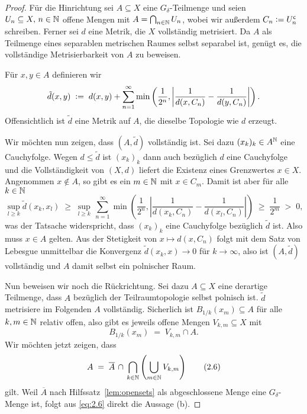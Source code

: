 \documentclass[../main/main.tex]{subfiles}
\begin{document}
	\begin{proof}
		Für die Hinrichtung sei $A \subseteq X$ eine $G_\delta$-Teilmenge und seien 
		$U_n \subseteq X, \, n \in \mathbb{N}$ offene Mengen mit 
		$A = \bigcap_{n \in \mathbb{N}} U_n$, wobei wir außerdem 
		$C_n \vcentcolon = U_n^{\mathsf{c}}$ schreiben. Ferner sei 
		$d$ eine Metrik, die $X$ vollständig metrisiert. 
		Da $A$ als Teilmenge eines separablen metrischen Raumes 
		selbst separabel ist, genügt es, die vollständige Metrisierbarkeit 
		von $A$ zu beweisen.
		
		Für $x, y \in A$ definieren wir
		\[\tilde{d}(x, y) \; \vcentcolon = \; d(x, y) + \sum_{n=1}^{\infty} \min \left(
		\frac{1}{2^n}, \left| \frac{1}{d(x, C_n)} - \frac{1}{d(y, C_n)} \right|
		\right) \text{.}\]
		Offensichtlich ist $\tilde{d}$ eine Metrik auf $A$, 
		die dieselbe Topologie wie $d$ erzeugt. 
		
		Wir möchten nun zeigen, dass $(A, \tilde{d})$ vollständig ist. 
		Sei dazu $(x_k)_k \in A^{\mathbb{N}}$ eine Cauchyfolge. Wegen $d \leq \tilde{d}$ 
		ist $(x_k)_k$ dann auch bezüglich $d$ eine Cauchyfolge und die 
		Vollständigkeit von $(X, d)$ liefert die Existenz eines Grenzwertes 
		$x \in X$. Angenommen $x \notin A$, so gibt es ein $m \in \mathbb{N}$ mit 
		$x \in C_m$. Damit ist aber für alle $k \in \mathbb{N}$
		$$\sup_{l \geq k} \tilde{d}(x_k, x_l) \; \geq \; \sup_{l \geq k} 
		\, \sum_{n=1}^{\infty} \min \left(
		\frac{1}{2^n}, \left| \frac{1}{d(x_k, C_n)} -
		\frac{1}{d(x_l, C_n)} \right|
		\right) \; \geq \; \frac{1}{2^m} \; > \; 0 \text{,}$$
		was der Tatsache widerspricht, dass $(x_k)_k$ eine Cauchyfolge 
		bezüglich $\tilde{d}$ ist. Also muss $x \in A$ gelten. 
		Aus der Stetigkeit von $x \mapsto d(x, C_n)$ folgt mit dem 
		Satz von Lebesgue unmittelbar die Konvergenz 
		$\tilde{d}(x_k, x) \to 0$ für $k \to \infty$,
		also ist $(A, \tilde{d})$ vollständig und $A$ damit selbst ein
		polnischer Raum.
		
		Nun beweisen wir noch die Rückrichtung. Sei dazu $A \subseteq X$ eine derartige Teilmenge, dass
		$A$ bezüglich der Teilraumtopologie selbst polnisch ist. $\tilde{d}$ metrisiere im Folgenden 
		$A$ vollständig.
		Sicherlich ist $B_{1/k}(x_m) \subseteq A$ für alle 
		$k, m \in \mathbb{N}$ relativ offen, also gibt es jeweils offene Mengen 
		$V_{k, m} \subseteq X$ mit
		\[ B_{1/k}(x_m) \; = \; V_{k, m} 
		\cap A \text{.} \label{eq:2.5} \tag{2.5}\]
		Wir möchten jetzt zeigen, dass
		\[ A \; = \; \overline{A} \, \cap \, 
		\bigcap_{k \in \mathbb{N}} \left( \bigcup_{m \in \mathbb{N}} V_{k, m} \right) 
		\label{eq:2.6} \tag{2.6}\]
		gilt. 
		Weil $\overline{A}$ nach Hilfssatz~\ref{lem:opensets} 
		als abgeschlossene Menge eine $G_\delta$-Menge ist, 
		folgt aus \eqref{eq:2.6} direkt die Aussage (b).
		

\end{proof}
\end{document}
